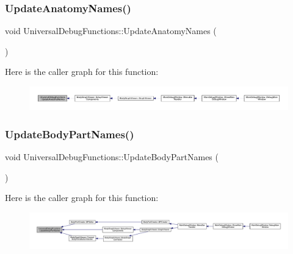 \mbox{\label{namespace_universal_debug_functions_ab344b96caf2f2580133e89fe7af30e17}} 
\subsubsection{\texorpdfstring{Update\+Anatomy\+Names()}{UpdateAnatomyNames()}}
{\footnotesize\ttfamily void Universal\+Debug\+Functions\+::\+Update\+Anatomy\+Names (\begin{DoxyParamCaption}{ }\end{DoxyParamCaption})}

Here is the caller graph for this function\+:
\nopagebreak
\begin{figure}[H]
\begin{center}
\leavevmode
\includegraphics[width=350pt]{d4/d16/namespace_universal_debug_functions_ab344b96caf2f2580133e89fe7af30e17_icgraph}
\end{center}
\end{figure}
\mbox{\label{namespace_universal_debug_functions_a069b66d16867ce9cdef140dc7b77f297}} 
\subsubsection{\texorpdfstring{Update\+Body\+Part\+Names()}{UpdateBodyPartNames()}}
{\footnotesize\ttfamily void Universal\+Debug\+Functions\+::\+Update\+Body\+Part\+Names (\begin{DoxyParamCaption}{ }\end{DoxyParamCaption})}

Here is the caller graph for this function\+:
\nopagebreak
\begin{figure}[H]
\begin{center}
\leavevmode
\includegraphics[width=350pt]{d4/d16/namespace_universal_debug_functions_a069b66d16867ce9cdef140dc7b77f297_icgraph}
\end{center}
\end{figure}
